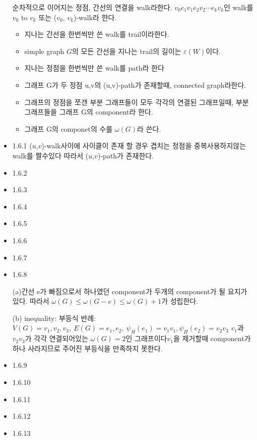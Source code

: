 \documentclass{oblivoir}
\begin{document}
\begin{itemize}
    \begin{dfn}[walk]순차적으로 이어지는 정점, 간선의 연결을 walk라한다. $v_{0}e_{1}v_{1}e_{2}v_{2} \cdots e_{k}v_{k}$인 walk를 $v_0$ to $v_k$ 또는 ($v_0$, $v_k$)-walk라 한다.
        \begin{itemize}
            \item 지나는 간선을 한번씩만 쓴 walk를 trail이라한다.
            \item simple graph $G$의 모든 간선을 지나는 trail의 길이는 $\varepsilon (W)$이다.
            \item 지나는 정점을 한번씩만 쓴 walk를 path라 한다
            \item 그래프 G가 두 정점 u,v의  (u,v)-path가 존재할때, connected graph라한다.
            \item 그래프의 정점을 쪼갠 부분 그래프들이 모두 각각의 연결된 그래프일때, 부분 그래프들을 그래프 G의 component라 한다.
            \item 그래프 G의 componet의 수를 $\omega(G)$라 쓴다.
        \end{itemize}
    \end{dfn}
    \item 1.6.1 ($u$,$v$)-walk사이에 사이클이 존재 할 경우 겹치는 정점을 중복사용하지않는 walk를 짤수있다 따라서 ($u$,$v$)-path가 존재한다.
    
    \item 1.6.2
    
    \item 1.6.3
    \item 1.6.4
    \item 1.6.5
    \item 1.6.6
    \item 1.6.7

    \item 1.6.8

    (a)간선 e가 빠짐으로서 하나였던 component가 두개의 component가 될 요지가 있다. 따라서 $\omega(G) \le \omega(G-e) \le \omega(G)+1 $가 성립한다.

    (b) inequality: 부등식
    반례: $V(G) = { v_1, v_2, v_3} ,\: E(G) = { e_1 , e_2} ,\: \psi_H(e_1) = v_1v_1 ,\psi_H(e_2) = v_2v_3  $
    $v_1$과 $v_2v_3$가 각각 연결되어있는 $\omega(G) = 2$인 그래프이다$v_1$을 제거할때 component가 하나 사라지므로 주어진 부등식을 만족하지 못한다.

    \item 1.6.9
    \item 1.6.10
    \item 1.6.11
    \item 1.6.12
    \item 1.6.13


\end{itemize}
\end{document}
